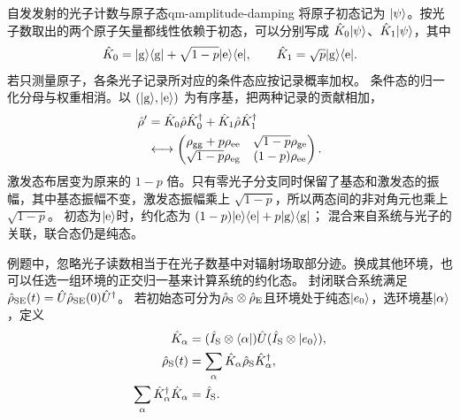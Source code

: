 \begin{example}{自发发射的光子计数与原子态}{qm-amplitude-damping}
    将原子初态记为 $\lvert\psi\rangle$。按光子数取出的两个原子矢量都线性依赖于初态，可以分别写成 $\hat{K}_0\lvert\psi\rangle$、$\hat{K}_1\lvert\psi\rangle$，其中
    \begin{equation}
        \hat{K}_0 = \lvert\mathrm{g}\rangle\langle\mathrm{g}\rvert + \sqrt{1 - p}\lvert\mathrm{e}\rangle\langle\mathrm{e}\rvert,
        \qquad
        \hat{K}_1 = \sqrt p\lvert\mathrm{g}\rangle\langle\mathrm{e}\rvert.
    \end{equation}
    若只测量原子，各条光子记录所对应的条件态应按记录概率加权。
    条件态的归一化分母与权重相消。以 $(\lvert\mathrm{g}\rangle,\lvert\mathrm{e}\rangle)$ 为有序基，把两种记录的贡献相加，
    \begin{equation}
        \begin{alignedat}{1}
            \hat{\rho}' &= \hat{K}_0\hat{\rho}\hat{K}_0^\dagger + \hat{K}_1\hat{\rho}\hat{K}_1^\dagger\\
            &\longleftrightarrow \begin{pmatrix}
                \rho_{\mathrm{g}\mathrm{g}} + p\rho_{\mathrm{e}\mathrm{e}}&\sqrt{1 - p}\rho_{\mathrm{g}\mathrm{e}}\\
                \sqrt{1 - p}\rho_{\mathrm{e}\mathrm{g}}&(1 - p)\rho_{\mathrm{e}\mathrm{e}}
            \end{pmatrix}.
        \end{alignedat}
    \end{equation}
    激发态布居变为原来的 $1 - p$ 倍。只有零光子分支同时保留了基态和激发态的振幅，其中基态振幅不变，激发态振幅乘上 $\sqrt{1 - p}$，所以两态间的非对角元也乘上 $\sqrt{1 - p}$。
    初态为$\lvert\mathrm{e}\rangle$时，约化态为
    $(1 - p)\lvert\mathrm{e}\rangle\langle\mathrm{e}\rvert + p\lvert\mathrm{g}\rangle\langle\mathrm{g}\rvert$；
    混合来自系统与光子的关联，联合态仍是纯态。
\end{example}

例题中，忽略光子读数相当于在光子数基中对辐射场取部分迹。换成其他环境，也可以任选一组环境的正交归一基来计算系统的约化态。
封闭联合系统满足$\hat{\rho}_{\mathrm{SE}}(t) = \hat{U}\hat{\rho}_{\mathrm{SE}}(0)\hat{U}^\dagger$。
若初始态可分为$\hat{\rho}_{\mathrm{S}} \otimes \hat{\rho}_{\mathrm{E}}$且环境处于纯态$\lvert e_0\rangle$，选环境基$\lvert\alpha\rangle$，定义
\begin{subequations}
    \begin{align}
        \hat{K}_\alpha &= (\hat{I}_{\mathrm{S}} \otimes \langle\alpha\rvert)\hat{U}(\hat{I}_{\mathrm{S}} \otimes \lvert e_0\rangle),\\
        \hat{\rho}_{\mathrm{S}}(t) &= \sum_\alpha \hat{K}_\alpha\hat{\rho}_{\mathrm{S}}\hat{K}_\alpha^\dagger,\\
        \sum_\alpha \hat{K}_\alpha^\dagger \hat{K}_\alpha &= \hat{I}_{\mathrm{S}}.
    \end{align}
\end{subequations}

